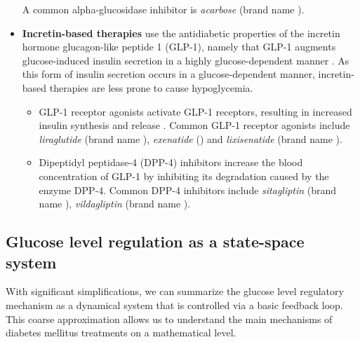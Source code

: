 \begin{itemize}
A common alpha-glucosidase inhibitor is \emph{acarbose} (brand name ). \\
\item \textbf{Incretin-based therapies} use the antidiabetic properties of the incretin hormone glucagon-like peptide 1 (GLP-1), namely that GLP-1 augments glucose-induced insulin secretion in a highly glucose-dependent manner \citep{nauck2009incretin,lovshin2009incretin}. As this form of insulin secretion occurs in a glucose-dependent manner, incretin-based therapies are less prone to cause hypoglycemia.
\begin{itemize}
        \item GLP-1 receptor agonists activate GLP-1 receptors, resulting in increased insulin synthesis and release \citep{drucker1987glucagon}. Common GLP-1 receptor agonists include \emph{liraglutide} (brand name ), \emph{exenatide} () and \emph{lixisenatide} (brand name ). \\
        \item Dipeptidyl peptidase-4 (DPP-4) inhibitors increase the blood concentration of GLP-1 by inhibiting its degradation caused by the enzyme DPP-4. Common DPP-4 inhibitors include \emph{sitagliptin} (brand name ), \emph{vildagliptin} (brand name ).  \\
\end{itemize}
\end{itemize} 





\ifx
\subsection{Glucose level regulation as a state-space system}
With significant simplifications, we can summarize the glucose level regulatory mechanism as a dynamical system that is controlled via a basic feedback loop. This coarse approximation allows us to understand the main mechanisms of diabetes mellitus treatments on a mathematical level.

